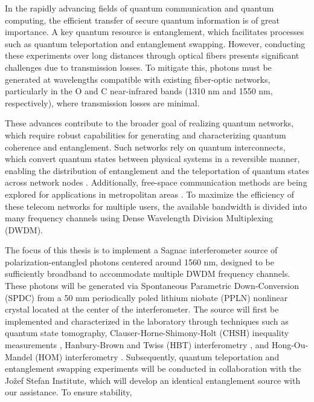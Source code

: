 \documentclass{article}
\theoremstyle{mytheoremstyle}
\theoremstyle{mytheoremstyle}
\theoremstyle{myproblemstyle}
\begin{document}
In the rapidly advancing fields of quantum communication and quantum computing, the efficient transfer of secure quantum information is of great importance.
A key quantum resource is entanglement, which facilitates processes such as quantum teleportation and entanglement swapping.
However, conducting these experiments over long distances through optical fibers presents significant challenges due to transmission losses. To mitigate this,
photons must be generated at wavelengths compatible with existing fiber-optic networks,
particularly in the O and C near-infrared bands (1310 nm and 1550 nm, respectively), where transmission losses are minimal.\par
These advances contribute to the broader goal of realizing quantum networks,
which require robust capabilities for generating and characterizing quantum coherence and entanglement.
Such networks rely on quantum interconnects, which convert quantum states between physical systems in a reversible manner,
enabling the distribution of entanglement and the teleportation of quantum states across network nodes \cite{Kimble_2008}.
Additionally, free-space communication methods are being explored for applications in metropolitan areas \cite{Kržić_et_al_2023}.
To maximize the efficiency of these telecom networks for multiple users,
the available bandwidth is divided into many frequency channels using Dense Wavelength Division Multiplexing (DWDM).\par
The focus of this thesis is to implement a Sagnac interferometer source of polarization-entangled photons centered around 1560 nm,
designed to be sufficiently broadband to accommodate multiple DWDM frequency channels.
These photons will be generated via Spontaneous Parametric Down-Conversion \cite{jesseSPDC} (SPDC) from a 
50 mm periodically poled lithium niobate (PPLN) nonlinear crystal located at the center of the interferometer.
The source will first be implemented and characterized in the laboratory through techniques such as quantum state tomography,
Clauser-Horne-Shimony-Holt (CHSH) inequality measurements \cite{Clauser_Horne_Shimony_Holt_1969},
Hanbury-Brown and Twiss (HBT) interferometry \cite{Brown_Twiss_1954}, and Hong-Ou-Mandel (HOM) interferometry \cite{Hong_Ou_Mandel_1987}.
Subsequently, quantum teleportation \cite{Bouwmeester_Pan_Mattle_Eibl_Weinfurter_Zeilinger_1997}
and entanglement swapping \cite{Jennewein_Weihs_Pan_Zeilinger_2001} experiments will be conducted in collaboration with the Jožef Stefan Institute,
which will develop an identical entanglement source with our assistance. To ensure stability,
\end{document}
